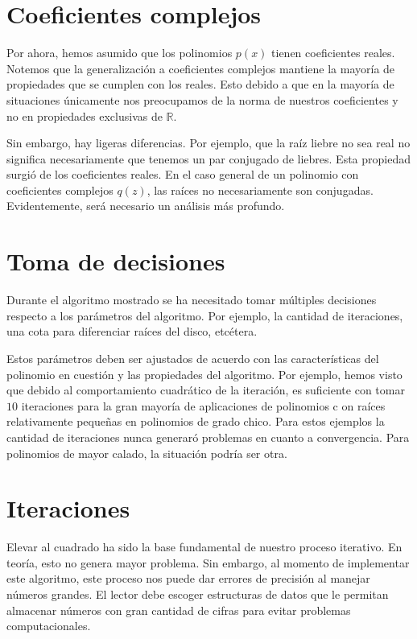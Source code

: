 \documentclass[oneside,11pt]{book}
\theoremstyle{definition}
\theoremstyle{plain}
\theoremstyle{remark}
\begin{document}
\section{Coeficientes complejos}

Por ahora, hemos asumido que los polinomios $p(x)$ tienen coeficientes reales.
Notemos que la generalizaci\'on a coeficientes complejos mantiene la mayor\'ia de propiedades que se cumplen con los reales. 
Esto debido a que en la mayor\'ia de situaciones \'unicamente nos preocupamos de la norma de nuestros coeficientes y no en propiedades exclusivas de $\mathbb{R}$.

Sin embargo, hay ligeras diferencias. 
Por ejemplo, que la ra\'iz liebre no sea real no significa necesariamente que tenemos un par conjugado de liebres. Esta propiedad surgi\'o de los coeficientes reales.
En el caso general de un polinomio con coeficientes complejos $q(z)$, las ra\'ices no necesariamente son conjugadas. 
Evidentemente, ser\'a necesario un an\'alisis m\'as profundo. 

\section{Toma de decisiones}
Durante el algoritmo mostrado se ha necesitado tomar m\'ultiples decisiones respecto a los par\'ametros del algoritmo.
Por ejemplo, la cantidad de iteraciones, una cota para diferenciar ra\'ices del disco, etc\'etera.

Estos par\'ametros deben ser ajustados de acuerdo con las caracter\'isticas del polinomio en cuesti\'on 
y las propiedades del algoritmo.
Por ejemplo, hemos visto que debido al comportamiento cuadr\'atico de la iteraci\'on, 
es suficiente con tomar $10$ iteraciones para la gran mayor\'ia de aplicaciones de polinomios c
on ra\'ices relativamente pequeñas en polinomios de grado chico.
Para estos ejemplos la cantidad de iteraciones nunca generar\'o problemas en cuanto a convergencia. 
Para polinomios de mayor calado, la situaci\'on podr\'ia ser otra. 

\section{Iteraciones}
Elevar al cuadrado ha sido la base fundamental de nuestro proceso iterativo. 
En teor\'ia, esto no genera mayor problema.
Sin embargo, al momento de implementar este algoritmo, 
este proceso nos puede dar errores de precisi\'on al manejar n\'umeros grandes.
El lector debe escoger estructuras de datos que le permitan almacenar n\'umeros 
con gran cantidad de cifras para evitar problemas computacionales.
\end{document}
